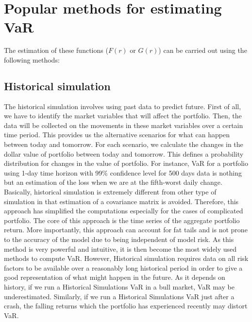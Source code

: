 \documentclass[a4paper,11pt,oneside]{book}
\begin{document}
\section{Popular methods for estimating VaR}
The estimation of these functions ($F(r)$ or $G(r)$) can be carried out using the
following methods:

\subsection{Historical simulation}

The historical simulation involves using past data to predict future. First of all, we
have to identify the market variables that will affect the portfolio. Then, the data
will be collected on the movements in these market variables over a certain time
period. This provides us the alternative scenarios for what can happen between
today and tomorrow. For each scenario, we calculate the changes in the dollar
value of portfolio between today and tomorrow. This defines a probability
distribution for changes in the value of portfolio. For instance, VaR for a portfolio
using 1-day time horizon with 99\% confidence level for 500 days data is nothing
but an estimation of the loss when we are at the fifth-worst daily change.
\newline\newline Basically, historical simulation is extremely different from other type of
simulation in that estimation of a covariance matrix is avoided. Therefore, this approach has simplified the computations especially for the cases of complicated
portfolio.\newline\newline
The core of this approach is the time series of the aggregate portfolio return. More
importantly, this approach can account for fat tails and is not prone to the
accuracy of the model due to being independent of model risk. As this method is
very powerful and intuitive, it is then become the most widely used methods to
compute VaR. However, Historical simulation requires data on all risk factors to be available over a reasonably long historical period in order to give a good
representation of what might happen in the future. As it depends on history, if we run a Historical Simulations VaR in a bull market, VaR may be underestimated. Similarly, if we run a Historical Simulations VaR just after a crash, the falling returns which the portfolio has experienced recently may distort VaR.
\end{document}
